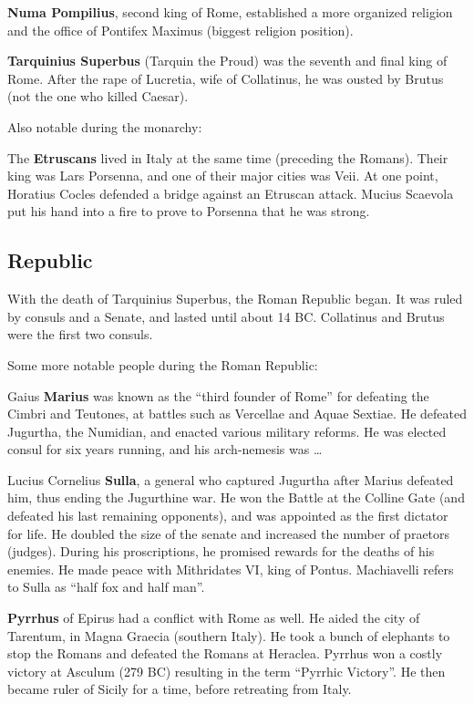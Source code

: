 \textbf{Numa Pompilius}, second king of Rome,
established a more organized religion and the office of Pontifex Maximus (biggest religion position).

\textbf{Tarquinius Superbus} (Tarquin the Proud) was the seventh and final king of Rome.
After the rape of Lucretia, wife of Collatinus, he was ousted by Brutus (not the one who killed Caesar).

Also notable during the monarchy:

The \textbf{Etruscans} lived in Italy at the same time (preceding the Romans).
Their king was Lars Porsenna, and one of their major cities was Veii.
At one point, Horatius Cocles defended a bridge against an Etruscan attack.
Mucius Scaevola put his hand into a fire to prove to Porsenna that he was strong.

\subsection*{Republic}

With the death of Tarquinius Superbus, the Roman Republic began.
It was ruled by consuls and a Senate, and lasted until about 14 BC\@.
Collatinus and Brutus were the first two consuls.

Some more notable people during the Roman Republic:

Gaius \textbf{Marius} was known as the ``third founder of Rome'' for defeating the Cimbri and Teutones,
at battles such as Vercellae and Aquae Sextiae.
He defeated Jugurtha, the Numidian, and enacted various military reforms.
He was elected consul for six years running, and his arch-nemesis was \ldots

Lucius Cornelius \textbf{Sulla}, a general who captured Jugurtha after Marius defeated him,
thus ending the Jugurthine war.
He won the Battle at the Colline Gate (and defeated his last remaining opponents),
and was appointed as the first dictator for life.
He doubled the size of the senate and increased the number of praetors (judges).
During his proscriptions, he promised rewards for the deaths of his enemies.
He made peace with Mithridates VI, king of Pontus.
Machiavelli refers to Sulla as ``half fox and half man''.

\textbf{Pyrrhus} of Epirus had a conflict with Rome as well.
He aided the city of Tarentum, in Magna Graecia (southern Italy).
He took a bunch of elephants to stop the Romans and defeated the Romans at Heraclea.
Pyrrhus won a costly victory at Asculum (279 BC) resulting in the term ``Pyrrhic Victory''.
He then became ruler of Sicily for a time, before retreating from Italy.

